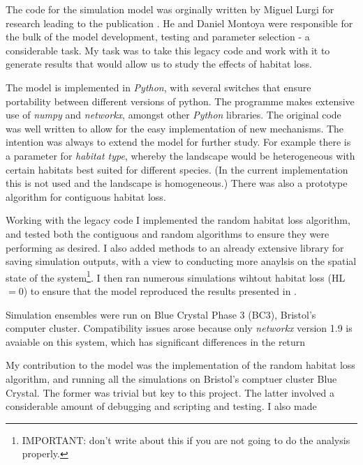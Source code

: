 
%

The code for the simulation model was orginally written by Miguel Lurgi for research leading to the publication \cite{lurgi2015effects}. He and Daniel Montoya were responsible for the bulk of the model development, testing and parameter selection - a considerable task. My task was to take this legacy code and work with it to generate results that would allow us to study the effects of habitat loss.

The model is implemented in \emph{Python}, with several switches that ensure portability between different versions of python. The programme makes extensive use of \emph{numpy} and \emph{networkx}, amongst other \emph{Python} libraries. The original code was well written to allow for the easy implementation of new mechanisms. The intention was always to extend the model for further study. For example there is a parameter for \emph{habitat type}, whereby the landscape would be heterogeneous with certain habitats best suited for different species. (In the current implementation this is not used and the landscape is homogeneous.) There was also a prototype algorithm for contiguous habitat loss.  

Working with the legacy code I implemented the random habitat loss algorithm, and tested both the contiguous and random algorithms to ensure they were performing as desired. I also added methods to an already extensive library for saving simulation outputs, with a view to conducting more anaylsis on the spatial state of the system\footnote{IMPORTANT: don't write about this if you are not going to do the analysis properly.}. I then ran numerous simulations wihtout habitat loss (HL$ =0$) to ensure that the model reproduced the results presented in \cite{lurgi2015effects}. 

Simulation ensembles were run on Blue Crystal Phase 3 (BC3), Bristol's computer cluster. Compatibility issues arose because only \emph{networkx} version 1.9 is avaiable on this system, which has significant differences in the return  



My contribution to the model was the implementation of the random habitat loss algorithm, and running all the simulations on Bristol's comptuer cluster Blue Crystal. The former was trivial but key to this project. The latter involved a considerable amount of debugging and scripting and testing. I also made  

